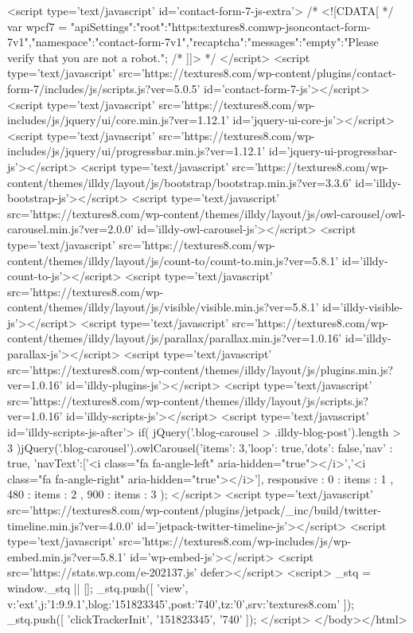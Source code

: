 <script type='text/javascript' id='contact-form-7-js-extra'>
/* <![CDATA[ */
var wpcf7 = {"apiSettings":{"root":"https:\/\/textures8.com\/wp-json\/contact-form-7\/v1","namespace":"contact-form-7\/v1"},"recaptcha":{"messages":{"empty":"Please verify that you are not a robot."}}};
/* ]]> */
</script>
<script type='text/javascript' src='https://textures8.com/wp-content/plugins/contact-form-7/includes/js/scripts.js?ver=5.0.5' id='contact-form-7-js'></script>
<script type='text/javascript' src='https://textures8.com/wp-includes/js/jquery/ui/core.min.js?ver=1.12.1' id='jquery-ui-core-js'></script>
<script type='text/javascript' src='https://textures8.com/wp-includes/js/jquery/ui/progressbar.min.js?ver=1.12.1' id='jquery-ui-progressbar-js'></script>
<script type='text/javascript' src='https://textures8.com/wp-content/themes/illdy/layout/js/bootstrap/bootstrap.min.js?ver=3.3.6' id='illdy-bootstrap-js'></script>
<script type='text/javascript' src='https://textures8.com/wp-content/themes/illdy/layout/js/owl-carousel/owl-carousel.min.js?ver=2.0.0' id='illdy-owl-carousel-js'></script>
<script type='text/javascript' src='https://textures8.com/wp-content/themes/illdy/layout/js/count-to/count-to.min.js?ver=5.8.1' id='illdy-count-to-js'></script>
<script type='text/javascript' src='https://textures8.com/wp-content/themes/illdy/layout/js/visible/visible.min.js?ver=5.8.1' id='illdy-visible-js'></script>
<script type='text/javascript' src='https://textures8.com/wp-content/themes/illdy/layout/js/parallax/parallax.min.js?ver=1.0.16' id='illdy-parallax-js'></script>
<script type='text/javascript' src='https://textures8.com/wp-content/themes/illdy/layout/js/plugins.min.js?ver=1.0.16' id='illdy-plugins-js'></script>
<script type='text/javascript' src='https://textures8.com/wp-content/themes/illdy/layout/js/scripts.js?ver=1.0.16' id='illdy-scripts-js'></script>
<script type='text/javascript' id='illdy-scripts-js-after'>
if( jQuery('.blog-carousel > .illdy-blog-post').length > 3 ){jQuery('.blog-carousel').owlCarousel({'items': 3,'loop': true,'dots': false,'nav' : true, 'navText':['<i class="fa fa-angle-left" aria-hidden="true"></i>','<i class="fa fa-angle-right" aria-hidden="true"></i>'], responsive : { 0 : { items : 1 }, 480 : { items : 2 }, 900 : { items : 3 } }});}
</script>
<script type='text/javascript' src='https://textures8.com/wp-content/plugins/jetpack/_inc/build/twitter-timeline.min.js?ver=4.0.0' id='jetpack-twitter-timeline-js'></script>
<script type='text/javascript' src='https://textures8.com/wp-includes/js/wp-embed.min.js?ver=5.8.1' id='wp-embed-js'></script>
<script src='https://stats.wp.com/e-202137.js' defer></script>
<script>
	_stq = window._stq || [];
	_stq.push([ 'view', {v:'ext',j:'1:9.9.1',blog:'151823345',post:'740',tz:'0',srv:'textures8.com'} ]);
	_stq.push([ 'clickTrackerInit', '151823345', '740' ]);
</script>
</body></html>
